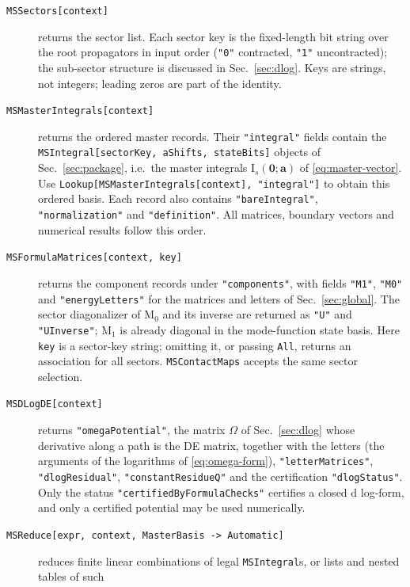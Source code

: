 \documentclass[11pt,a4paper]{article}
\begin{document}
\begin{description}
  \item[\texttt{MSSectors[context]}] returns the sector list. Each sector key is the fixed-length
        bit string over the root propagators in input order (\texttt{"0"} contracted,
        \texttt{"1"} uncontracted); the
        sub-sector structure is discussed in Sec.~\ref{sec:dlog}. Keys are
        strings, not integers; leading zeros are part of the identity.
  \item[\texttt{MSMasterIntegrals[context]}] returns the ordered master records.
        Their \texttt{"integral"} fields contain the
        \texttt{MSIntegral[sectorKey, aShifts, stateBits]} objects of Sec.~\ref{sec:package}, i.e.\
        the master integrals $\text{I}_s(\bm 0;\bm a)$ of \eqref{eq:master-vector}.
        Use \texttt{Lookup[MSMasterIntegrals[context], "integral"]} to obtain this ordered basis.
        Each record also contains \texttt{"bareIntegral"}, \texttt{"normalization"} and
        \texttt{"definition"}. All matrices, boundary vectors and numerical results follow this order.
  \item[\texttt{MSFormulaMatrices[context, key]}] returns the component records under
        \texttt{"components"}, with fields \texttt{"M1"}, \texttt{"M0"} and
        \texttt{"energyLetters"} for the matrices and letters of Sec.~\ref{sec:global}.
        The sector diagonalizer of $\text{M}_0$ and its inverse are returned as
        \texttt{"U"} and \texttt{"UInverse"}; $\text{M}_1$ is already diagonal in the mode-function state basis.
        Here \texttt{key} is a sector-key string; omitting it, or passing \texttt{All},
        returns an association for all sectors. \texttt{MSContactMaps} accepts the same
        sector selection.
  \item[\texttt{MSDLogDE[context]}] returns \texttt{"omegaPotential"}, the matrix $\Omega$ of
        Sec.~\ref{sec:dlog} whose derivative along a path is the DE matrix, together with the
        letters (the arguments of the logarithms of \eqref{eq:omega-form}),
        \texttt{"letterMatrices"}, \texttt{"dlogResidual"}, \texttt{"constantResidueQ"} and the
        certification \texttt{"dlogStatus"}. Only the status \texttt{"certifiedByFormulaChecks"}
        certifies a closed d log-form, and only a certified potential may be used numerically.
  \item[\texttt{MSReduce[expr, context, MasterBasis -> Automatic]}] reduces finite linear
        combinations of legal \texttt{MSIntegral}s, or lists and nested tables of such

\end{description}
\end{document}
